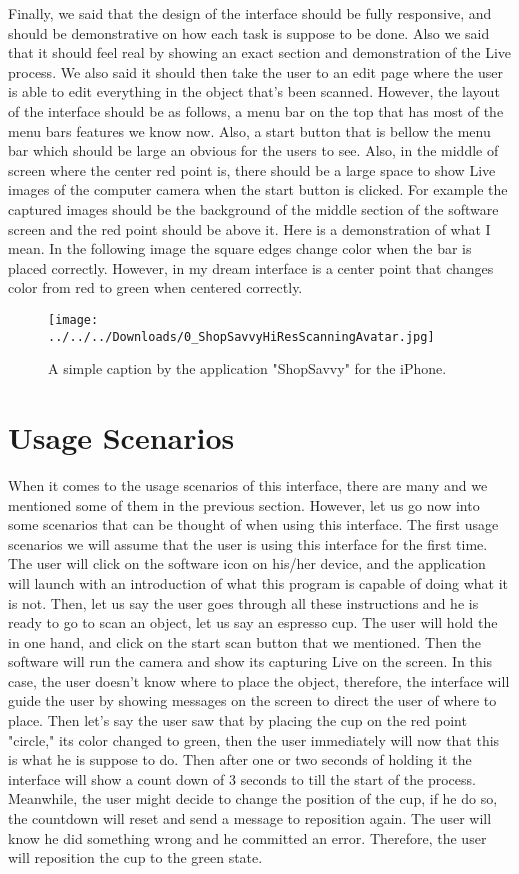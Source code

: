 \documentclass[12pt, oneside]{amsart}   	%
\begin{document}
Finally, we said that the design of the interface should be fully responsive, and should be demonstrative on how each task is suppose to be done.  Also we said that it should feel real by showing an exact section and demonstration of the Live process.  We also said it should then take the user to an edit page where the user is able to edit everything in the object that's been scanned.  However, the layout of the interface should be as follows, a menu bar on the top that has most of the menu bars features we know now.  Also, a start button that is bellow the menu bar which should be large an obvious for the users to see.  Also, in the middle of screen where the center red point is, there should be a large space to show Live images of the computer camera when the start button is clicked.  For example the captured images should be the background of the middle section of the software screen and the red point should be above it.  Here is a demonstration of what I mean. In the following image the square edges change color when the bar is placed correctly. However, in my dream interface is a center point that changes color from red to green when centered correctly.

\begin{figure}[!h]
\centering
\texttt{[image: ../../../Downloads/0\_ShopSavvyHiResScanningAvatar.jpg]}
\caption{A simple caption by the application "ShopSavvy" for the iPhone. \cite{LastImage}}
\label{overflow}
\end{figure}

 \section{Usage Scenarios}
When it comes to the usage scenarios of this interface, there are many and we mentioned some of them in the previous section.  However, let us go now into some scenarios that can be thought of when using this interface.  The first usage scenarios we will assume that the user is using this interface for the first time.  The user will click on the software icon on his/her device, and the application will launch with an introduction of what this program is capable of doing what it is not.  Then, let us say the user goes through all these instructions and he is ready to go to scan an object, let us say an espresso cup.  The user will hold the in one hand, and click on the start scan button that we mentioned.  Then the software will run the camera and show its capturing Live on the screen.  In this case, the user doesn't know where to place the object, therefore, the interface will guide the user by showing messages on the screen to direct the user of where to place. Then let's say the user saw that by placing the cup on the red point "circle," its color changed to green, then the user immediately will now that this is what he is suppose to do.  Then after one or two seconds of holding it the interface will show a count down of 3 seconds to till the start of the process. Meanwhile, the user might decide to change the position of the cup, if he do so, the countdown will reset and send a message to reposition again. The user will know he did something wrong and he committed an error. Therefore, the user will reposition the cup to the green state. 
\end{document}
